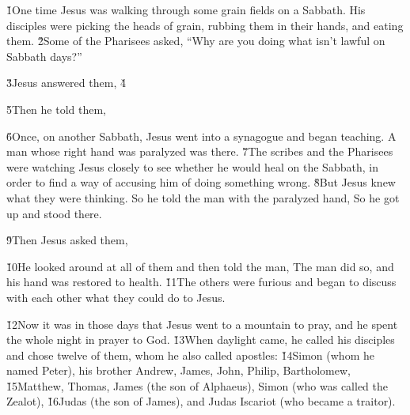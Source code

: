 \v{1}One time Jesus was walking through some grain fields on a Sabbath. His disciples were picking the heads of grain, rubbing them in their hands, and eating them. \v{2}Some of the Pharisees asked, ``Why are you doing what isn't lawful on Sabbath days?''

\v{3}Jesus answered them,  \v{4}

\v{5}Then he told them, 

\v{6}Once, on another Sabbath, Jesus went into a synagogue and began teaching. A man whose right hand was paralyzed was there. \v{7}The scribes and the Pharisees were watching Jesus closely to see whether he would heal on the Sabbath, in order to find a way of accusing him of doing something wrong. \v{8}But Jesus knew what they were thinking. So he told the man with the paralyzed hand,  So he got up and stood there.

\v{9}Then Jesus asked them, 

\v{10}He looked around at all of them and then told the man,  The man did so, and his hand was restored to health. \v{11}The others were furious and began to discuss with each other what they could do to Jesus.

\v{12}Now it was in those days that Jesus went to a mountain to pray, and he spent the whole night in prayer to God. \v{13}When daylight came, he called his disciples and chose twelve of them, whom he also called apostles: \v{14}Simon (whom he named Peter), his brother Andrew, James, John, Philip, Bartholomew, \v{15}Matthew, Thomas, James (the son of Alphaeus), Simon (who was called the Zealot), \v{16}Judas (the son of James), and Judas Iscariot (who became a traitor).

